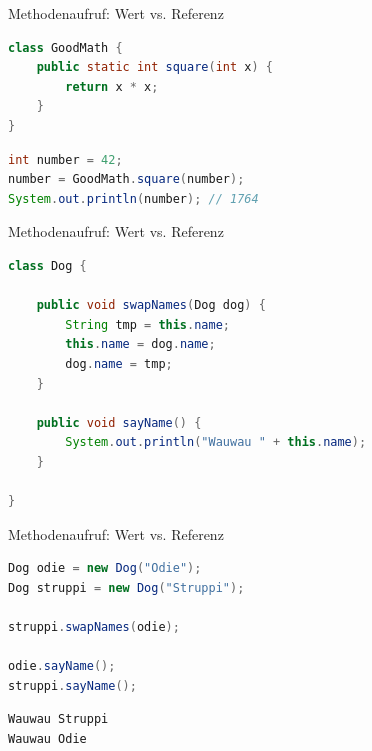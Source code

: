 \documentclass[18pt]{beamer}
\begin{document}
\begin{frame}[fragile]{Methodenaufruf: Wert vs. Referenz}
    \begin{exampleblock}{}
        \begin{lstlisting}[language=Java]
class GoodMath {
    public static int square(int x) {
        return x * x;
    }
}
        \end{lstlisting}
    \end{exampleblock}

    \begin{lstlisting}[language=Java]
int number = 42;
number = GoodMath.square(number);
System.out.println(number); // 1764
    \end{lstlisting}
\end{frame}

\begin{frame}[fragile]{Methodenaufruf: Wert vs. Referenz}
    \begin{exampleblock}{}
        \begin{lstlisting}[language=Java]
class Dog {
    
    public void swapNames(Dog dog) {
        String tmp = this.name;
        this.name = dog.name;
        dog.name = tmp;
    }

    public void sayName() {
        System.out.println("Wauwau " + this.name);
    }

}
        \end{lstlisting}
    \end{exampleblock}
\end{frame}

\begin{frame}[fragile]{Methodenaufruf: Wert vs. Referenz}
    \begin{lstlisting}[language=Java]
Dog odie = new Dog("Odie");
Dog struppi = new Dog("Struppi");

struppi.swapNames(odie);

odie.sayName();
struppi.sayName();
    \end{lstlisting}

    \begin{exampleblock}{}
        \begin{lstlisting}
Wauwau Struppi
Wauwau Odie
        \end{lstlisting}
    \end{exampleblock}
\end{frame}
\end{document}

